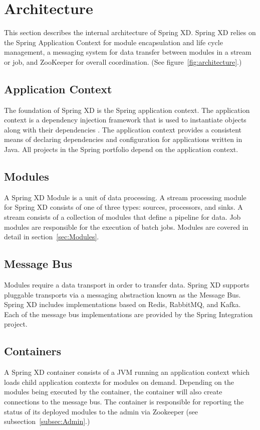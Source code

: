 \section{Architecture}
This section describes the internal architecture of Spring XD. Spring XD
relies on the Spring Application Context for module encapsulation and
life cycle management, a messaging system for data
transfer between modules in a stream or job, and ZooKeeper for overall
coordination. (See figure~\ref{fig:architecture}.)

\subsection{Application Context}
The foundation of Spring XD is the Spring application context. The application
context is a dependency injection framework that is used to instantiate
objects along with their dependencies \cite{spring-framework-reference}.
The application context provides a consistent means of declaring dependencies
and configuration for applications written in Java. All projects in the
Spring portfolio depend on the application context.

\subsection{Modules}
A Spring XD Module is a unit of data processing. A stream processing module
for Spring XD consists of one of three types: sources, processors, and sinks.
A stream consists of a collection of modules that define a pipeline for data. 
Job modules are responsible for the execution of batch jobs. Modules are
covered in detail in section~\ref{sec:Modules}.

\subsection{Message Bus}
Modules require a data transport in order to transfer data. Spring XD
supports pluggable transports via a messaging abstraction known as 
the Message Bus. Spring XD includes implementations based on Redis, RabbitMQ,
and Kafka. Each of the message bus implementations are provided by the
Spring Integration project.

\subsection{Containers}
A Spring XD container consists of a JVM running an application context which
loads child application contexts for modules on demand. Depending on the modules
being executed by the container, the container will also create connections to
the message bus. The container is responsible for reporting the status of its deployed
modules to the admin via Zookeeper (see subsection~\ref{subsec:Admin}.)

